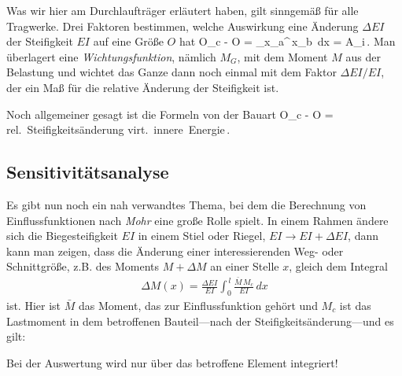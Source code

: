 {{{{Was wir hier am Durchlauftr\"{a}ger erl\"{a}utert haben, gilt sinngem\"{a}{\ss} f\"{u}r alle Tragwerke.
Drei Faktoren bestimmen, welche Auswirkung eine \"{A}nderung $\Delta EI$ der Steifigkeit $EI$ auf eine Gr\"{o}{\ss}e $O$ hat
\bfo
O_c - O = \int_{x_a}^{\,x_b}  \,dx =  \cdot \delta A_i\,.
\efo
Man \"{u}berlagert eine {\em  Wichtungsfunktion\/}, n\"{a}mlich $M_G$, mit dem Moment $M$ aus der Belastung und wichtet das Ganze dann noch einmal mit dem Faktor $\Delta EI/EI$, der ein Ma{\ss} f\"{u}r die relative \"{A}nderung der Steifigkeit ist.

Noch allgemeiner gesagt ist die Formeln von der Bauart
\bfo
O_c - O = \mbox{rel. Steifigkeits\"{a}nderung} \times \mbox{virt. innere Energie}\,.
\efo

\textcolor{blau2}{\section{Sensitivit\"{a}tsanalyse}}
Es gibt nun noch ein nah verwandtes Thema, bei dem die Berechnung von Einflussfunktionen nach {\em Mohr\/} eine gro{\ss}e Rolle spielt. In einem Rahmen \"{a}ndere sich die Biegesteifigkeit $EI$ in einem Stiel oder Riegel, $EI \to EI + \Delta EI$, dann kann man zeigen, dass die \"{A}nderung einer interessierenden Weg- oder Schnittgr\"{o}{\ss}e, z.B. des Moments $M + \Delta M$ an einer Stelle $x$, gleich dem Integral
\begin{align}
\Delta M(x) = \frac{\Delta EI}{EI} \int_0^{\,l} \frac{\bar{M}\,M_c}{EI}\,dx
\end{align}
ist. Hier ist $\bar{M}$ das Moment, das zur Einflussfunktion geh\"{o}rt und $M_c$ ist das Lastmoment in dem betroffenen Bauteil---nach der Steifigkeits\"{a}nderung---und es gilt:\\

\hspace*{-12pt}\colorbox{hellgrau}{\parbox{0.98\textwidth}{Bei der Auswertung wird nur \"{u}ber das betroffene Element integriert!}}\\

}}}}
